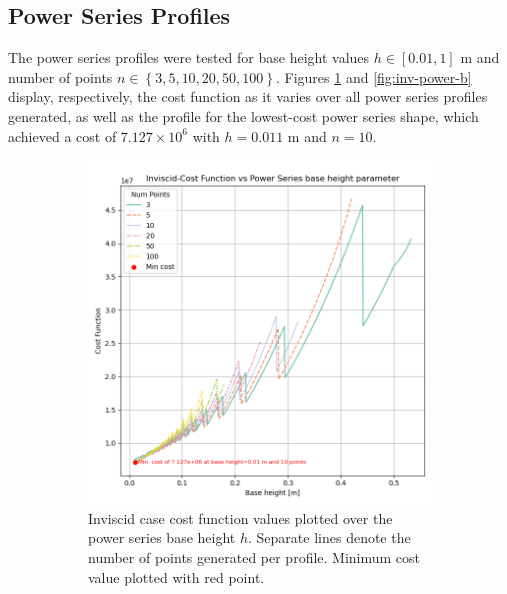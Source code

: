 \documentclass[11pt]{article}
\begin{document}
\subsection{Power Series Profiles}
The power series profiles were tested for base height values $h \in [0.01, 1] \text{ m}$ and number of points $n \in \left\{3, 5, 10, 20, 50, 100 \right\}$. Figures \ref{fig:inv-power-a} and \ref{fig:inv-power-b} display, respectively, the cost function as it varies over all power series profiles generated, as well as the profile for the lowest-cost power series shape, which achieved a cost of $7.127 \times 10^6$ with $h=0.011 \text{ m}$ and $n=10$.
\begin{figure}[H]
\centering
\begin{subfigure}[b]{0.45\textwidth}
    \centering
    \includegraphics[width=\linewidth]{../results/inviscid/power_series.png}
    \caption{Inviscid case cost function values plotted over the power series base height $h$. Separate lines denote the number of points generated per profile. Minimum cost value plotted with red point.}
    \label{fig:inv-power-a}
\end{subfigure}
\hfill
\begin{subfigure}[b]{0.45\textwidth}
    \centering

\end{subfigure}
\end{figure}
\end{document}

